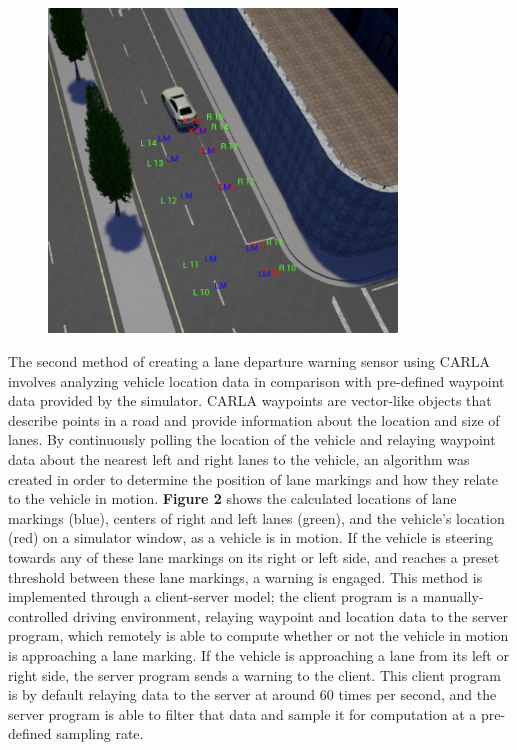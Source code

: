\documentclass[12pt]{article}
\renewcommand{\_}{\kern-1.5pt\textunderscore\kern-1.5pt}
\begin{document}
\begin{figure}[H]
\centering
\advance\leftskip 0.0in		\includegraphics[width=3.65in,height=3.39in]{./media/image3.png}
\par
\vspace{\baselineskip}
\end{figure}



\vspace{\baselineskip}
The second method of creating a lane departure warning sensor using CARLA involves analyzing vehicle location data in comparison with pre-defined waypoint data provided by the simulator. CARLA waypoints are vector-like objects that describe points in a road and provide information about the location and size of lanes. By continuously polling the location of the vehicle and relaying waypoint data about the nearest left and right lanes to the vehicle, an algorithm was created in order to determine the position of lane markings and \tab  how they relate to the vehicle in motion. \textbf{Figure 2 }shows the calculated locations of lane markings (blue), centers of right and left lanes (green), and the vehicle’s location (red) on a simulator window, as a vehicle is in motion. If the vehicle is steering towards any of these lane markings on its right or left side, and reaches a preset threshold between these lane markings, a warning is engaged. This method is implemented through a client-server model; the client program is a manually-controlled driving environment, relaying waypoint and location data to the server program, which remotely is able to compute whether or not the vehicle in motion is approaching a lane marking. If the vehicle is approaching a lane from its left or right side, the server program sends a warning to the client. This client program is by default relaying data to the server at around 60 times per second, and the server program is able to filter that data and sample it for computation at a pre-defined sampling rate.\par
\end{document}
